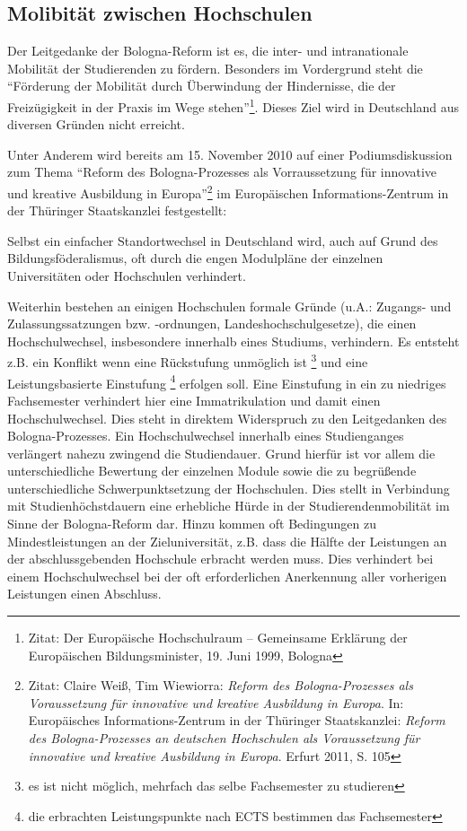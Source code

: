 
\subsection*{Molibität zwischen Hochschulen}

Der Leitgedanke der Bologna-Reform ist es, die inter- und intranationale
Mobilität der Studierenden zu fördern. Besonders im Vordergrund steht die
"`Förderung der Mobilität durch Überwindung der Hindernisse, die der
Freizügigkeit in der Praxis im Wege stehen"'\footnote{Zitat: Der Europäische Hochschulraum – Gemeinsame Erklärung der Europäischen Bildungsminister, 19. Juni 1999, Bologna}.  Dieses Ziel wird in
Deutschland aus diversen Gründen nicht erreicht.

Unter Anderem wird bereits am 15. November 2010 auf einer
Podiumsdiskussion zum Thema "`Reform des Bologna-Prozesses als Vorraussetzung
für innovative und kreative Ausbildung in Europa"'\footnote{Zitat: Claire Weiß, Tim Wiewiorra: \textit{Reform des Bologna-Prozesses als Voraussetzung
  für innovative und kreative Ausbildung in Europa}. In: Europäisches
  Informations-Zentrum in der Thüringer Staatskanzlei:
  \textit{Reform des Bologna-Prozesses an deutschen Hochschulen als Voraussetzung für
  innovative und kreative Ausbildung in Europa}. Erfurt 2011, S. 105} im Europäischen
Informations-Zentrum in der Thüringer Staatskanzlei festgestellt:
\begin{displayquote}
 Selbst ein einfacher Standortwechsel in Deutschland wird, auch auf Grund des
 Bildungsföderalismus, oft durch die engen Modulpläne der einzelnen
 Universitäten oder Hochschulen verhindert.
\end{displayquote}
Weiterhin bestehen an einigen Hochschulen formale Gründe (u.A.: Zugangs- und
Zulassungssatzungen bzw. -ordnungen, Landeshochschulgesetze), die einen
Hochschulwechsel, insbesondere innerhalb eines Studiums, verhindern. Es entsteht
z.B. ein Konflikt wenn eine Rückstufung unmöglich ist \footnote{es ist nicht
möglich, mehrfach das selbe Fachsemester zu studieren} und eine
Leistungsbasierte Einstufung \footnote{die erbrachten Leistungspunkte nach ECTS
bestimmen das Fachsemester} erfolgen soll. Eine Einstufung in ein zu niedriges
Fachsemester verhindert hier eine Immatrikulation und damit einen
Hochschulwechsel. Dies steht in direktem Widerspruch zu den Leitgedanken des
Bologna-Prozesses.
Ein Hochschulwechsel innerhalb eines Studienganges verlängert nahezu zwingend
die Studiendauer. Grund hierfür ist vor allem die unterschiedliche Bewertung der
einzelnen Module sowie die zu begrüßende unterschiedliche Schwerpunktsetzung der
Hochschulen. Dies stellt in Verbindung mit Studienhöchstdauern eine erhebliche
Hürde in der Studierendenmobilität im Sinne der Bologna-Reform dar.
\newpage
Hinzu kommen oft Bedingungen zu Mindestleistungen an der Zieluniversität, z.B.
dass die Hälfte der Leistungen an der abschlussgebenden Hochschule erbracht
werden muss. Dies verhindert bei einem Hochschulwechsel bei der oft
erforderlichen Anerkennung aller vorherigen Leistungen einen Abschluss.

